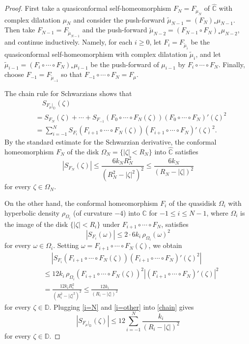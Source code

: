 \documentclass[10pt,a4paper]{amsart}
\begin{document}
\begin{proof}
First take a quasiconformal self-homeomorphism $F_{N}=F_{\mu_{N}}$ of $\widehat{\mathbb C}$ with complex dilatation 
$\mu_{N}$ and consider the push-forward $\tilde \mu_{N-1}=(F_{N})_* \mu_{N-1}$.
Then take 
$F_{N-1}=F_{\tilde \mu_{N-1}}$ and the push-forward 
$\tilde \mu_{N-2}=(F_{N-1}\circ F_{N})_* \mu_{N-2}$,
and continue inductively. Namely, for each $i \geq 0$,
let $F_{i}=F_{\tilde \mu_{i}}$ be the quasiconformal self-homeomorphism with complex dilatation 
$\tilde \mu_{i}$, and let 
$\tilde \mu_{i-1}=(F_{i}\circ \cdots \circ F_{N})_* \mu_{i-1}$ be the push-forward 
of $\mu_{i-1}$ by $F_{i}\circ \cdots \circ F_{N}$.
Finally, choose $F_{-1}=F_{\tilde \mu_{-1}}$ so that 
$F_{-1} \circ \cdots \circ F_{N}=F_\mu$.

The chain rule for Schwarzians shows that
\begin{align}\label{chain}
&\quad S_{F_\mu|_{\mathbb D}}(\zeta)\\
&=S_{F_{N}}(\zeta)+ \cdots +
S_{F_{-1}}(F_{0} \circ \cdots \circ F_{N}(\zeta))(F_{0} \circ \cdots \circ F_{N})'(\zeta)^2\\
&=
\sum_{i=-1}^{N} S_{F_i}(F_{i+1} \circ \cdots \circ F_{N}(\zeta))(F_{i+1} \circ \cdots \circ F_{N})'(\zeta)^2.
\end{align}
By the standard estimate for the Schwarzian derivative,
the conformal homeomorphism $F_{N}$ of the disk 
$\Omega_{N}=\{|\zeta|<R_{N}\}$ into $\widehat{\mathbb C}$ satisfies 
\begin{equation}\label{i=N}
|S_{F_{N}}(\zeta)|
\leq \frac{6k_{N}R_{N}^2}{(R_{N}^2-|\zeta|^2)^2} \leq \frac{6k_{N}}{(R_{N}-|\zeta|)^2}
\end{equation}
for every $\zeta \in \Omega_{N}$.

On the other hand, the conformal homeomorphism $F_{i}$ of the 
quasidisk $\Omega_i$ with hyperbolic density $\rho_{\Omega_i}$ (of curvature $-4$) into $\mathbb C$ for $-1 \leq i \leq N-1$, 
where $\Omega_i$ is the image of the disk $\{|\zeta|<R_i\}$ under
$F_{i+1} \circ \cdots \circ F_{N}$, satisfies 
$$
|S_{F_i}(\omega)| \leq 2 \cdot 6k_i\, \rho_{\Omega_i}(\omega)^2
$$
for every $\omega \in \Omega_i$.
Setting $\omega=F_{i+1} \circ \cdots \circ F_{N}(\zeta)$, we obtain
\begin{align}\label{i=other}
&\quad \ |S_{F_i}(F_{i+1} \circ \cdots \circ F_{N}(\zeta))(F_{i+1} \circ \cdots \circ F_{N})'(\zeta)^2|\\
&\leq 12k_i \,\rho_{\Omega_i}(F_{i+1} \circ \cdots \circ F_{N}(\zeta))^2|(F_{i+1} 
\circ \cdots \circ F_{N})'(\zeta)|^2\\
&=\frac{12k_i R_i^2}{(R_i^2-|\zeta|^2)^2} \leq  \frac{12k_i}{(R_i-|\zeta|)^2}
\end{align}
for every $\zeta \in \mathbb D$.
Plugging \eqref{i=N} and \eqref{i=other} into \eqref{chain} gives
$$
|S_{F_\mu|_\mathbb D}(\zeta)| \leq 12 \sum_{i=-1}^{N} \frac{k_i}{(R_i-|\zeta|)^2}
$$
for every $\zeta \in \mathbb D$.
\end{proof}
\end{document}
